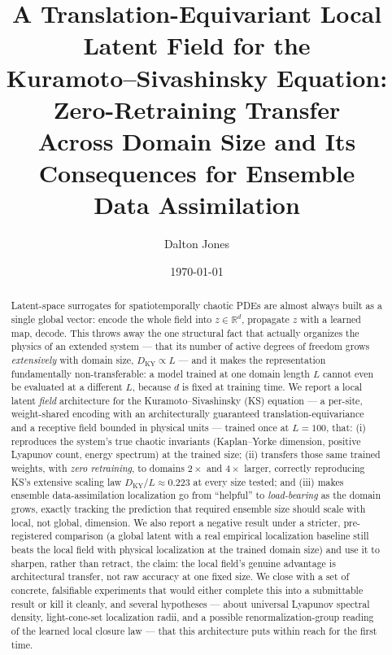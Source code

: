 \documentclass[11pt]{article}
\title{A Translation-Equivariant Local Latent Field for the\\
Kuramoto--Sivashinsky Equation: Zero-Retraining Transfer\\
Across Domain Size and Its Consequences for Ensemble\\
Data Assimilation}
\author{Dalton Jones}
\date{\today}
\begin{document}
\maketitle

\begin{abstract}
Latent-space surrogates for spatiotemporally chaotic PDEs are almost
always built as a single global vector: encode the whole field into
$z \in \mathbb{R}^d$, propagate $z$ with a learned map, decode. This
throws away the one structural fact that actually organizes the physics
of an extended system --- that its number of active degrees of freedom
grows \emph{extensively} with domain size, $D_{\mathrm{KY}} \propto L$
--- and it makes the representation fundamentally non-transferable: a
model trained at one domain length $L$ cannot even be evaluated at a
different $L$, because $d$ is fixed at training time. We report a local
latent \emph{field} architecture for the Kuramoto--Sivashinsky (KS)
equation --- a per-site, weight-shared encoding with an architecturally
guaranteed translation-equivariance and a receptive field bounded in
physical units --- trained once at $L=100$, that: (i) reproduces the
system's true chaotic invariants (Kaplan--Yorke dimension, positive
Lyapunov count, energy spectrum) at the trained size; (ii) transfers
those same trained weights, with \emph{zero retraining}, to domains
$2\times$ and $4\times$ larger, correctly reproducing KS's extensive
scaling law $D_{\mathrm{KY}}/L \approx 0.223$ at every size tested; and
(iii) makes ensemble data-assimilation localization go from
``helpful'' to \emph{load-bearing} as the domain grows, exactly
tracking the prediction that required ensemble size should scale with
local, not global, dimension. We also report a negative result under a
stricter, pre-registered comparison (a global latent with a real
empirical localization baseline still beats the local field with
physical localization at the trained domain size) and use it to
sharpen, rather than retract, the claim: the local field's genuine
advantage is architectural transfer, not raw accuracy at one fixed
size. We close with a set of concrete, falsifiable experiments that
would either complete this into a submittable result or kill it
cleanly, and several hypotheses --- about universal Lyapunov spectral
density, light-cone-set localization radii, and a possible
renormalization-group reading of the learned local closure law --- that
this architecture puts within reach for the first time.
\end{abstract}
\end{document}
